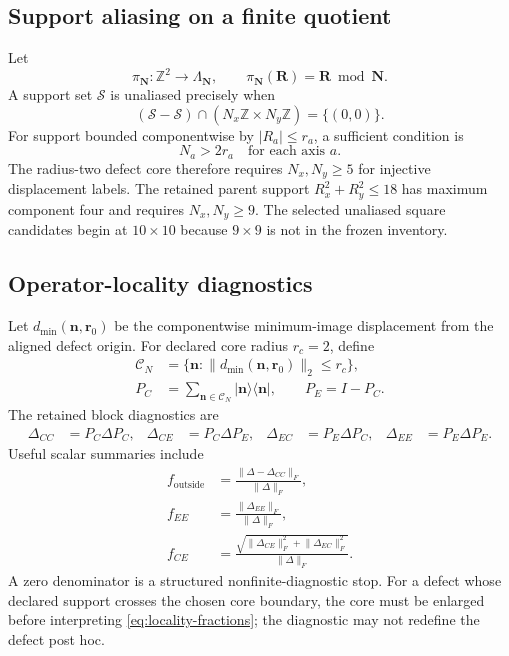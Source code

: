 \documentclass[11pt]{article}
\begin{document}
\subsection{Support aliasing on a finite quotient}

Let
\begin{equation}
  \pi_{\mathbf N}:\mathbb Z^2\longrightarrow\Lambda_{\mathbf N},
  \qquad
  \pi_{\mathbf N}(\mathbf R)=\mathbf R\bmod\mathbf N.
\end{equation}
A support set $\mathcal S$ is unaliased precisely when
\begin{equation}
  (\mathcal S-\mathcal S)
  \cap(N_x\mathbb Z\times N_y\mathbb Z)
  =\{(0,0)\}.
  \label{eq:support-injectivity}
\end{equation}
For support bounded componentwise by $|R_a|\le r_a$, a sufficient condition is
\begin{equation}
  N_a>2r_a\quad\text{for each axis }a.
  \label{eq:support-size-condition}
\end{equation}
The radius-two defect core therefore requires $N_x,N_y\ge5$ for injective displacement
labels.  The retained parent support $R_x^2+R_y^2\le18$ has maximum component four and
requires $N_x,N_y\ge9$.  The selected unaliased square candidates begin at
$10\times10$ because $9\times9$ is not in the frozen inventory.

\subsection{Operator-locality diagnostics}

Let $d_{\min}(\mathbf n,\mathbf r_0)$ be the componentwise minimum-image displacement
from the aligned defect origin.  For declared core radius $r_c=2$, define
\begin{align}
  \mathcal C_N&=\{\mathbf n:\lVert d_{\min}(\mathbf n,\mathbf r_0)\rVert_2\le r_c\},\\
  P_C&=\sum_{\mathbf n\in\mathcal C_N}|\mathbf n\rangle\langle\mathbf n|,
  \qquad P_E=I-P_C.
\end{align}
The retained block diagnostics are
\begin{align}
  \Delta_{CC}&=P_C\Delta P_C,&
  \Delta_{CE}&=P_C\Delta P_E,&
  \Delta_{EC}&=P_E\Delta P_C,&
  \Delta_{EE}&=P_E\Delta P_E.
\end{align}
Useful scalar summaries include
\begin{align}
  f_{\mathrm{outside}}
  &=\frac{\lVert\Delta-\Delta_{CC}\rVert_F}{\lVert\Delta\rVert_F},\\
  f_{EE}&=\frac{\lVert\Delta_{EE}\rVert_F}{\lVert\Delta\rVert_F},\\
  f_{CE}&=\frac{
    \sqrt{\lVert\Delta_{CE}\rVert_F^2+\lVert\Delta_{EC}\rVert_F^2}
  }{\lVert\Delta\rVert_F}.
  \label{eq:locality-fractions}
\end{align}
A zero denominator is a structured nonfinite-diagnostic stop.  For a defect whose
declared support crosses the chosen core boundary, the core must be enlarged before
interpreting \eqref{eq:locality-fractions}; the diagnostic may not redefine the defect
post hoc.
\end{document}
